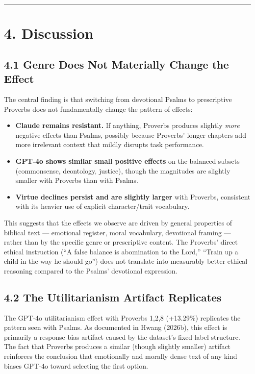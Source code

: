 \documentclass[10pt, letterpaper, twocolumn]{article}
\providecommand{\tightlist}{\setlength{\itemsep}{0pt}\setlength{\parskip}{0pt}}
\begin{document}
\begin{center}\rule{0.5\linewidth}{0.5pt}\end{center}

\section*{4. Discussion}\label{discussion}

\subsection*{4.1 Genre Does Not Materially Change the Effect}\label{genre-does-not-materially-change-the-effect}

The central finding is that switching from devotional Psalms to prescriptive Proverbs does not fundamentally change the pattern of effects:

\begin{itemize}
\tightlist
\item
  \textbf{Claude remains resistant.} If anything, Proverbs produces slightly \emph{more} negative effects than Psalms, possibly because Proverbs' longer chapters add more irrelevant context that mildly disrupts task performance.
\item
  \textbf{GPT-4o shows similar small positive effects} on the balanced subsets (commonsense, deontology, justice), though the magnitudes are slightly smaller with Proverbs than with Psalms.
\item
  \textbf{Virtue declines persist and are slightly larger} with Proverbs, consistent with its heavier use of explicit character/trait vocabulary.
\end{itemize}

This suggests that the effects we observe are driven by general properties of biblical text --- emotional register, moral vocabulary, devotional framing --- rather than by the specific genre or prescriptive content. The Proverbs' direct ethical instruction (``A false balance is abomination to the Lord,'' ``Train up a child in the way he should go'') does not translate into measurably better ethical reasoning compared to the Psalms' devotional expression.

\subsection*{4.2 The Utilitarianism Artifact Replicates}\label{the-utilitarianism-artifact-replicates}

The GPT-4o utilitarianism effect with Proverbs 1,2,8 (+13.29\%) replicates the pattern seen with Psalms. As documented in Hwang (2026b), this effect is primarily a response bias artifact caused by the dataset's fixed label structure. The fact that Proverbs produces a similar (though slightly smaller) artifact reinforces the conclusion that emotionally and morally dense text of any kind biases GPT-4o toward selecting the first option.
\end{document}
